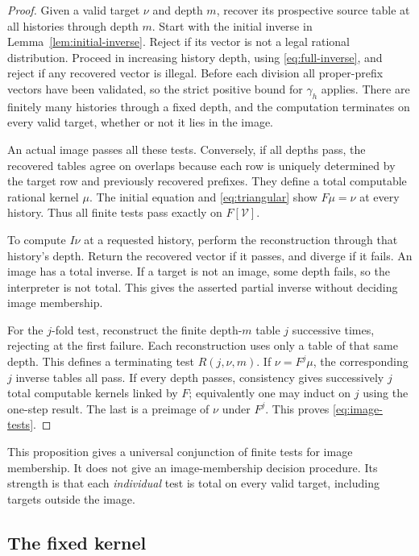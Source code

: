 \documentclass[11pt]{article}
\theoremstyle{definition}
\theoremstyle{remark}
\newcommand{\V}{\mathcal V}
\begin{document}
\begin{proof}
Given a valid target $\nu$ and depth $m$, recover its prospective
source table at all histories through depth $m$.  Start with the
initial inverse in Lemma~\ref{lem:initial-inverse}.  Reject if its
vector is not a legal rational distribution.  Proceed in increasing
history depth, using \eqref{eq:full-inverse}, and reject if any
recovered vector is illegal.  Before each division all proper-prefix
vectors have been validated, so the strict positive bound for
$\gamma_h$ applies.  There are finitely many histories through a
fixed depth, and the computation terminates on every valid target,
whether or not it lies in the image.

An actual image passes all these tests.  Conversely, if all depths
pass, the recovered tables agree on overlaps because each row is
uniquely determined by the target row and previously recovered
prefixes.  They define a total computable rational kernel $\mu$.
The initial equation and \eqref{eq:triangular} show $F\mu=\nu$ at
every history.  Thus all finite tests pass exactly on $F[\V]$.

To compute $I\nu$ at a requested history, perform the reconstruction
through that history's depth.  Return the recovered vector if it
passes, and diverge if it fails.  An image has a total inverse.  If a
target is not an image, some depth fails, so the interpreter is not
total.  This gives the asserted partial inverse without deciding
image membership.

For the $j$-fold test, reconstruct the finite depth-$m$ table $j$
successive times, rejecting at the first failure.  Each reconstruction
uses only a table of that same depth.  This defines a terminating
test $R(j,\nu,m)$.  If $\nu=F^j\mu$, the corresponding $j$ inverse
tables all pass.  If every depth passes, consistency gives successively
$j$ total computable kernels linked by $F$; equivalently one may
induct on $j$ using the one-step result.  The last is a preimage of
$\nu$ under $F^j$.  This proves \eqref{eq:image-tests}.
\end{proof}

This proposition gives a universal conjunction of finite tests for
image membership.  It does not give an image-membership decision
procedure.  Its strength is that each \emph{individual} test is
total on every valid target, including targets outside the image.

\subsection{The fixed kernel}
\end{document}
